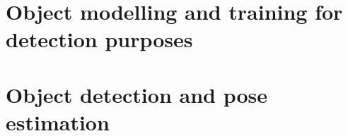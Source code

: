 \usepackage{amsmath}
\usepackage[
backend=biber,
style=numeric, %
]{biblatex}


\newcommand{\vmiddle}[1]{\begin{tabular}{@{}c@{}} {#1} \end{tabular}}

\english
\chapter{Object modelling and training for detection purposes}



\chapter{Object detection and pose estimation} \label{sec:vision}

\printbibliography


